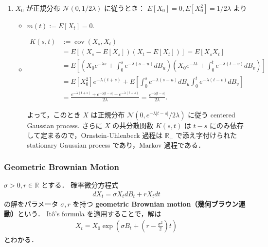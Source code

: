 \documentclass{jsarticle}
\begin{document}
\begin{enumerate}[label=(\roman*)]
    \item
    $X_{0}$ が正規分布 $\mathcal{N}(0, 1/2\lambda)$ に従うとき：
    $E[X_0]=0, E[X_0^2]=1/2\lambda$ より
    \begin{itemize}
        \item 
        $m(t):=E[X_t]=0.$
        \item 
        \begin{align}
            K(s, t)
            &:= \operatorname{cov}(X_{s}, X_{t}) \\
            &= E[(X_s-E[X_s])(X_t-E[X_t])]
            = E[X_s X_t] \\
            &= E[(X_0e^{-\lambda s}+\int_{0}^{s}e^{-\lambda(s-u)}dB_{u})
            (X_0e^{-\lambda t}+\int_{0}^{t}e^{-\lambda(t-v)}dB_{v})] \\
            &= E[X_0^2]e^{-\lambda(t+s)}
            + E[\int_{0}^{s}e^{-\lambda(s-u)}dB_{u}\int_{0}^{t}e^{-\lambda(t-v)}dB_{v}] \\
            &= \frac{e^{-\lambda(t+s)}+e^{-\lambda\lvert t-s\rvert}-e^{-\lambda(t+s)}}{2\lambda}
            = \frac{e^{-\lambda\lvert t-s\rvert}}{2\lambda}.
        \end{align}

        よって，このとき $X$ は正規分布 $\mathcal{N}(0, e^{-\lambda\lvert t-s\rvert}/2\lambda)$ に従う centered Gaussian process.
        さらに $X$ の共分散関数 $K(s, t)$ は $t-s$ にのみ依存して定まるので，Ornstein-Uhlenbeck 過程は $\mathbb{R}_+$ で添え字付けられた stationary Gaussian process であり，Markov 過程である．
    \end{itemize}
\end{enumerate}

\subsubsection{Geometric Brownian Motion}

$\sigma>0, r\in\mathbb{R}$ とする．
確率微分方程式
\begin{align}
    dX_t
    = \sigma X_t dB_t
    + rX_t dt
\end{align}
の解をパラメータ $\sigma, r$ を持つ \textbf{geometric Brownian motion（幾何ブラウン運動）}という．
It\^{o}'s formula を適用することで，解は
\begin{align}
    X_t
    = X_0\exp{(\sigma B_t+(r-\frac{\sigma^2}{2})t)}
\end{align}
とわかる．
\end{document}
